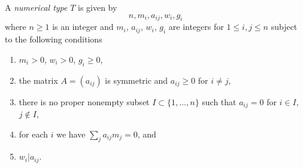 \begin{definition}
\label{definition-type}
A {\it numerical type} $T$ is given by
$$
n, m_i, a_{ij}, w_i, g_i
$$
where $n \geq 1$ is an integer and $m_i$, $a_{ij}$, $w_i$, $g_i$
are integers for $1 \leq i, j \leq n$ subject to the following conditions
\begin{enumerate}
\item $m_i > 0$, $w_i > 0$, $g_i \geq 0$,
\item the matrix $A = (a_{ij})$ is symmetric and $a_{ij} \geq 0$
for $i \not = j$,
\item there is no proper nonempty subset $I \subset \{1, \ldots, n\}$
such that $a_{ij} = 0$ for $i \in I$, $j \not \in I$,
\item for each $i$ we have $\sum_j a_{ij}m_j = 0$, and
\item $w_i | a_{ij}$.
\end{enumerate}
\end{definition}